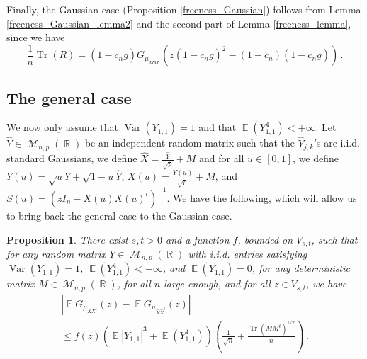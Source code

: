 \documentclass[11pt,a4paper]{article}
\DeclareMathOperator{\E}{\mathbb{E}}
\DeclareMathOperator{\R}{\mathbb{R}}
\DeclareMathOperator{\MM}{\mathcal{M}}
\DeclareMathOperator{\1}{\mathbf{1}}
\DeclareMathOperator{\Var}{\mathrm{Var}}
\DeclareMathOperator{\Tr}{\mathrm{Tr}}
\newcommand{\gbar}{\underline{g}}
\newcommand{\Xhat}{\widehat{X}}
\newcommand{\Yhat}{\widehat{Y}}
\newtheorem{Proposition}{Proposition}[section]
\theoremstyle{definition}
\begin{document}
Finally, the Gaussian case (Proposition \ref{freeness_Gaussian}) follows from Lemma \ref{freeness_Gaussian_lemma2} and the second part of Lemma \ref{freeness_lemma}, since we have
\begin{displaymath}
\frac1n \Tr(R) = (1-c_n\gbar) G_{\mu_{MM^t}}(z(1-c_n\gbar)^2 - (1-c_n)(1-c_n\gbar)) \, .
\end{displaymath}




\subsection{The general case}

We now only assume that $\Var(Y_{1,1})=1$ and that $\E(Y_{1,1}^4) < +\infty$. Let $\Yhat \in \MM_{n,p}(\R)$ be an independent random matrix such that the $\Yhat_{j,k}$'s are i.i.d. standard Gaussians, we define $\Xhat = \frac{\Yhat}{\sqrt{p}} + M$ and for all $u \in [0,1]$, we define $Y(u) = \sqrt{u}Y + \sqrt{1-u}\Yhat$, $X(u) = \frac{Y(u)}{\sqrt{p}} + M$, and $S(u) = (zI_n - X(u)X(u)^t)^{-1}$. We have the following, which will allow us to bring back the general case to the Gaussian case.

\begin{Proposition} \label{freeness_general_step1}
There exist $s,t>0$ and a function $f$, bounded on $V_{s,t}$, such that for any random matrix $Y \in \MM_{n,p}(\R)$ with i.i.d. entries satisfying $\Var(Y_{1,1})=1$, $\E(Y_{1,1}^4) < +\infty$, \underline{and $\E(Y_{1,1})=0$}, for any deterministic matrix $M \in \MM_{n,p}(\R)$, for all $n$ large enough, and for all $z \in V_{s,t}$, we have
\begin{multline*}
\left| \E G_{\mu_{XX^t}}(z) - \E G_{\mu_{\Xhat\Xhat^t}}(z) \right| \\
\le f(z) \left( \E |Y_{1,1}|^3 + \E(Y_{1,1}^4) \right) \left( \frac{1}{\sqrt{n}} + \frac{\Tr(MM^t)^{1/2}}{n} \right) \, .
\end{multline*}
\end{Proposition}
\end{document}
